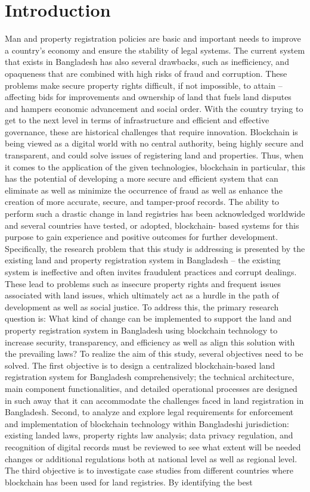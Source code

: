 \documentclass[conference]{IEEEtran}
\begin{document}
\section{Introduction}
Man and property registration policies are basic and important needs to improve a country's economy and ensure the stability of legal systems. The current system that exists in Bangladesh has also several drawbacks, such as inefficiency, and opaqueness that are combined with high risks of fraud and corruption. These problems make secure property rights difficult, if not impossible, to attain – affecting bids for improvements and ownership of land that fuels land disputes and hampers economic advancement and social order. With the country trying to get to the next level in terms of infrastructure and efficient and effective governance, these are historical challenges that require innovation. Blockchain is being viewed as a digital world with no central authority, being highly secure and transparent, and could solve issues of registering land and properties. Thus, when it comes to the application of the given technologies, blockchain in particular, this has the potential of developing a more secure and efficient system that can eliminate as well as minimize the occurrence of fraud as well as enhance the creation of more accurate, secure, and tamper-proof records. The ability to perform such a drastic change in land registries has been acknowledged worldwide and several countries have tested, or adopted, blockchain- based systems for this purpose to gain experience and positive outcomes for further development. Specifically, the research problem that this study is addressing is presented by the existing land and property registration system in Bangladesh – the existing system is ineffective and often invites fraudulent practices and corrupt dealings. These lead to problems such as insecure property rights and frequent issues associated with land issues, which ultimately act as a hurdle in the path of development as well as social justice. To address this, the primary research question is: What kind of change can be implemented to support the land and property registration system in Bangladesh using blockchain technology to increase security, transparency, and efficiency as well as align this solution with the prevailing laws? To realize the aim of this study, several objectives need to be solved. The first objective is to design a centralized blockchain-based land registration system for Bangladesh comprehensively; the technical architecture, main component functionalities, and detailed operational processes are designed in such away that it can accommodate the challenges faced in land registration in Bangladesh. Second, to analyze and explore legal requirements for enforcement and implementation of blockchain technology within Bangladeshi jurisdiction: existing landed laws, property rights law analysis; data privacy regulation, and recognition of digital records must be reviewed to see what extent will be needed changes or additional regulations both at national level as well as regional level. The third objective is to investigate case studies from different countries where blockchain has been used for land registries. By identifying the best 
\end{document}
